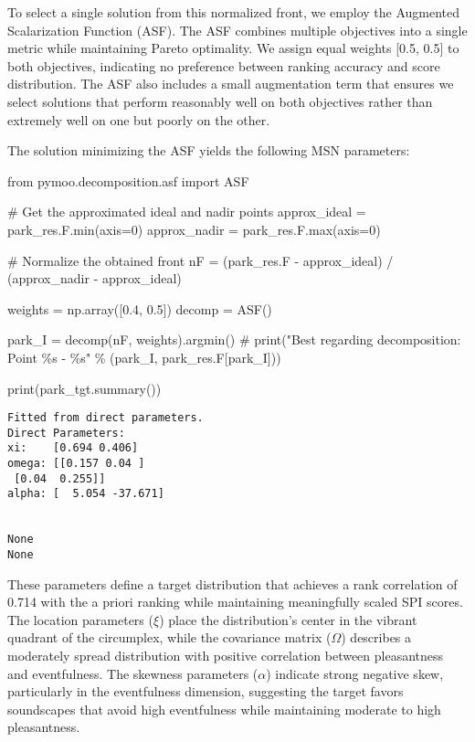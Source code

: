 \documentclass[
  authoryear,
  preprint,
  3p]{elsarticle}
\newenvironment{Shaded}{\begin{snugshade}}{\end{snugshade}}
\newcommand{\BuiltInTok}[1]{\textcolor[rgb]{0.00,0.23,0.31}{#1}}
\newcommand{\CommentTok}[1]{\textcolor[rgb]{0.37,0.37,0.37}{#1}}
\newcommand{\DecValTok}[1]{\textcolor[rgb]{0.68,0.00,0.00}{#1}}
\newcommand{\FloatTok}[1]{\textcolor[rgb]{0.68,0.00,0.00}{#1}}
\newcommand{\ImportTok}[1]{\textcolor[rgb]{0.00,0.46,0.62}{#1}}
\newcommand{\NormalTok}[1]{\textcolor[rgb]{0.00,0.23,0.31}{#1}}
\newcommand{\OperatorTok}[1]{\textcolor[rgb]{0.37,0.37,0.37}{#1}}
\begin{document}
To select a single solution from this normalized front, we employ the
Augmented Scalarization Function (ASF). The ASF combines multiple
objectives into a single metric while maintaining Pareto optimality. We
assign equal weights {[}0.5, 0.5{]} to both objectives, indicating no
preference between ranking accuracy and score distribution. The ASF also
includes a small augmentation term that ensures we select solutions that
perform reasonably well on both objectives rather than extremely well on
one but poorly on the other.

The solution minimizing the ASF yields the following MSN parameters:

\label{park_tgt}
\begin{Shaded}
\begin{Highlighting}[]
\ImportTok{from}\NormalTok{ pymoo.decomposition.asf }\ImportTok{import}\NormalTok{ ASF}

\CommentTok{\# Get the approximated ideal and nadir points}
\NormalTok{approx\_ideal }\OperatorTok{=}\NormalTok{ park\_res.F.}\BuiltInTok{min}\NormalTok{(axis}\OperatorTok{=}\DecValTok{0}\NormalTok{)}
\NormalTok{approx\_nadir }\OperatorTok{=}\NormalTok{ park\_res.F.}\BuiltInTok{max}\NormalTok{(axis}\OperatorTok{=}\DecValTok{0}\NormalTok{)}

\CommentTok{\# Normalize the obtained front}
\NormalTok{nF }\OperatorTok{=}\NormalTok{ (park\_res.F }\OperatorTok{{-}}\NormalTok{ approx\_ideal) }\OperatorTok{/}\NormalTok{ (approx\_nadir }\OperatorTok{{-}}\NormalTok{ approx\_ideal)}

\NormalTok{weights }\OperatorTok{=}\NormalTok{ np.array([}\FloatTok{0.4}\NormalTok{, }\FloatTok{0.5}\NormalTok{])}
\NormalTok{decomp }\OperatorTok{=}\NormalTok{ ASF()}

\NormalTok{park\_I }\OperatorTok{=}\NormalTok{ decomp(nF, weights).argmin()}
\CommentTok{\# print("Best regarding decomposition: Point \%s {-} \%s" \% (park\_I, park\_res.F[park\_I]))}

\BuiltInTok{print}\NormalTok{(park\_tgt.summary())}
\end{Highlighting}
\end{Shaded}

\begin{verbatim}
Fitted from direct parameters.
Direct Parameters:
xi:    [0.694 0.406]
omega: [[0.157 0.04 ]
 [0.04  0.255]]
alpha: [  5.054 -37.671]


None
None
\end{verbatim}

These parameters define a target distribution that achieves a rank
correlation of 0.714 with the a priori ranking while maintaining
meaningfully scaled SPI scores. The location parameters (\(\xi\)) place
the distribution's center in the vibrant quadrant of the circumplex,
while the covariance matrix (\(\Omega\)) describes a moderately spread
distribution with positive correlation between pleasantness and
eventfulness. The skewness parameters (\(\alpha\)) indicate strong
negative skew, particularly in the eventfulness dimension, suggesting
the target favors soundscapes that avoid high eventfulness while
maintaining moderate to high pleasantness.
\end{document}
